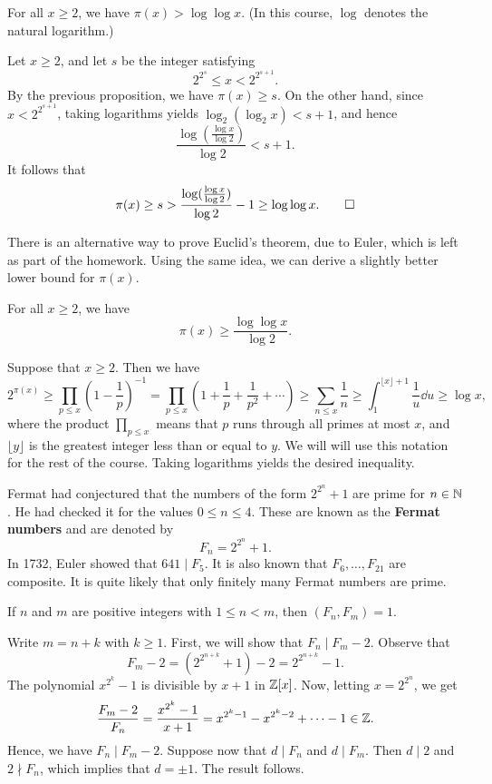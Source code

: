 \begin{cor}
For all $x \geq 2$, we have $\pi(x) > \log\log x$. (In this course, $\log$ denotes the natural logarithm.)
\end{cor}
\begin{pf}
Let $x \geq 2$, and let $s$ be the integer satisfying 
\[ 2^{2^s} \leq x < 2^{2^{s+1}}. \]
By the previous proposition, we have $\pi(x) \geq s$. On the other hand, since $x < 2^{2^{s+1}}$, 
taking logarithms yields $\log_2(\log_2 x) < s+1$, and hence 
\[ \frac{\log(\frac{\log x}{\log 2})}{\log 2} < s+1. \]
It follows that 
\[ \pi(x) \geq s > \frac{\log(\frac{\log x}{\log 2})}{\log 2} - 1 \geq \log\log x. \qedhere \]
\end{pf}

There is an alternative way to prove Euclid's theorem, due to Euler, which is left as part of the 
homework. Using the same idea, we can derive a slightly better lower bound for $\pi(x)$. 

\begin{prop}
For all $x \geq 2$, we have 
\[ \pi(x) \geq \frac{\log\log x}{\log 2}. \]
\end{prop}
\begin{pf}
Suppose that $x \geq 2$. Then we have 
\[ 2^{\pi(x)} \geq \prod_{p\leq x} \left(1 - \frac1p\right)^{-1} = \prod_{p\leq x} \left(1 + \frac1p
+ \frac{1}{p^2} + \cdots \right) \geq \sum_{n\leq x} \frac1n \geq \int_1^{\lfloor x \rfloor + 1}
\frac1u\dd u \geq \log x, \]
where the product $\prod_{p\leq x}$ means that $p$ runs through all primes at most $x$, and
$\lfloor y \rfloor$ is the greatest integer less than or equal to $y$. We will will use this 
notation for the rest of the course. Taking logarithms yields the desired inequality.
\end{pf}

Fermat had conjectured that the numbers of the form $2^{2^n}+1$ are prime for $n \in \mathbb{N}$. 
He had checked it for the values $0 \leq n \leq 4$. These are known as the {\bf Fermat numbers} and 
are denoted by 
\[ F_n = 2^{2^n} + 1. \] 
In 1732, Euler showed that $641 \mid F_5$. It is also known that $F_6, \dots, F_{21}$ are composite. 
It is quite likely that only finitely many Fermat numbers are prime. 

\begin{thm}[Poly\'a]
If $n$ and $m$ are positive integers with $1 \leq n < m$, then $(F_n, F_m) = 1$. 
\end{thm}
\begin{pf}
Write $m = n+k$ with $k \geq 1$. First, we will show that $F_n \mid F_m - 2$. Observe that 
\[ F_m - 2 = (2^{2^{n+k}} + 1) - 2 = 2^{2^{n+k}} - 1. \]
The polynomial $x^{2^k} - 1$ is divisible by $x+1$ in $\mathbb{Z}[x]$. Now, letting $x = 2^{2^n}$, we get 
\[ \frac{F_m-2}{F_n} = \frac{x^{2^k} - 1}{x+1} = x^{2^k-1} - x^{2^k-2} + \cdots - 1 \in \mathbb{Z}. \] 
Hence, we have $F_n \mid F_m - 2$. Suppose now that $d \mid F_n$ and $d \mid F_m$. Then 
$d \mid 2$ and $2 \nmid F_n$, which implies that $d = \pm1$. The result follows. 
\end{pf}

